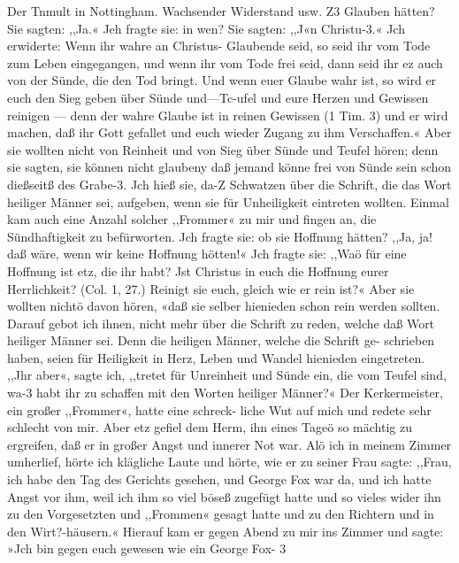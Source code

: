 Der Tnmult in Nottingham. Wachsender Widerstand usw. Z3
Glauben hätten? Sie sagten: ,,Ja.« Jeh fragte sie: in wen?
Sie sagten: ,,J«n Christu-3.« Jch erwiderte: Wenn ihr wahre
an Christus- Glaubende seid, so seid ihr vom Tode zum Leben
eingegangen, und wenn ihr vom Tode frei seid, dann seid ihr ez
auch von der Sünde, die den Tod bringt. Und wenn euer
Glaube wahr ist, so wird er euch den Sieg geben über Sünde
und—Tc-ufel und eure Herzen und Gewissen reinigen — denn der
wahre Glaube ist in reinen Gewissen (1 Tim. 3) und er wird
machen, daß ihr Gott gefallet und euch wieder Zugang zu ihm
Verschaffen.« Aber sie wollten nicht von Reinheit und von Sieg
über Sünde und Teufel hören; denn sie sagten, sie können nicht
glaubeny daß jemand könne frei von Sünde sein schon dießseitß
des Grabe-3. Jch hieß sie, da-Z Schwatzen über die Schrift, die
das Wort heiliger Männer sei, aufgeben, wenn sie für Unheiligkeit
eintreten wollten. Einmal kam auch eine Anzahl solcher ,,Frommer«
zu mir und fingen an, die Sündhaftigkeit zu befürworten. Jch
fragte sie: ob sie Hoffnung hätten? ,,Ja, ja! daß wäre, wenn
wir keine Hoffnung hötten!« Jch fragte sie: ,,Waö für eine
Hoffnung ist etz, die ihr habt? Jst Christus in euch die Hoffnung
eurer Herrlichkeit? (Col. 1, 27.) Reinigt sie euch, gleich wie er
rein ist?« Aber sie wollten nichtö davon hören, «daß sie selber
hienieden schon rein werden sollten. Darauf gebot ich ihnen,
nicht mehr über die Schrift zu reden, welche daß Wort heiliger
Männer sei. Denn die heiligen Männer, welche die Schrift ge-
schrieben haben, seien für Heiligkeit in Herz, Leben und Wandel
hienieden eingetreten. ,,Jhr aber«, sagte ich, ,,tretet für Unreinheit
und Sünde ein, die vom Teufel sind, wa-3 habt ihr zu schaffen
mit den Worten heiliger Männer?«
Der Kerkermeister, ein großer ,,Frommer«, hatte eine schreck-
liche Wut auf mich und redete sehr schlecht von mir. Aber etz
gefiel dem Herm, ihn eines Tageö so mächtig zu ergreifen, daß
er in großer Angst und innerer Not war. Alö ich in meinem
Zimmer umherlief, hörte ich klägliche Laute und hörte, wie er zu
seiner Frau sagte: ,,Frau, ich habe den Tag des Gerichts gesehen,
und George Fox war da, und ich hatte Angst vor ihm, weil ich
ihm so viel böseß zugefügt hatte und so vieles wider ihn zu den
Vorgesetzten und ,,Frommen« gesagt hatte und zu den Richtern
und in den Wirt?-häusern.« Hierauf kam er gegen Abend zu mir
ins Zimmer und sagte: »Jch bin gegen euch gewesen wie ein
George Fox- 3


